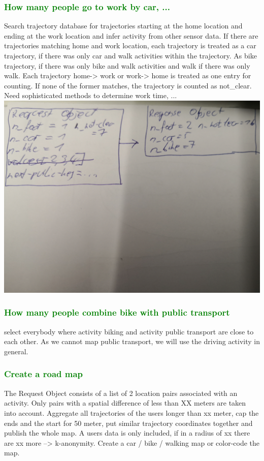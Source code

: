 \subsubsection{\textcolor{green}{How many people go to work by car, ...}}
Search trajectory database for trajectories starting at the home location and ending at the work location and infer activity from other sensor data.
If there are trajectories matching home and work location, each trajectory is treated as a car trajectory, if there was only car and walk activities within the trajectory.
As bike trajectory, if there was only bike and walk activities and walk if there was only walk.
Each trajectory home-> work or work-> home is treated as one entry for counting. If none of the former matches, the trajectory is counted as not\_clear.
Need sophisticated methods to determine work time, ... 
\includegraphics[width=\textwidth]{data/data-aggregation-transport-work-home.jpg}

\subsubsection{\textcolor{green}{How many people combine bike with public transport}}
select everybody where activity biking and activity public transport are close to each other.
As we cannot map public transport, we will use the driving activity in general.

\subsubsection{\textcolor{green}{Create a road map}}
The Request Object consists of a list of 2 location pairs associated with an activity. Only pairs with a spatial difference of less than XX meters are taken into account.
Aggregate all trajectories of the users longer than xx meter, cap the ends and the start for 50 meter, put similar trajectory coordinates together and publish the whole map.
A users data is only included, if in a radius of xx there are xx more --> k-anonymity.
Create a car / bike / walking map or color-code the map.


